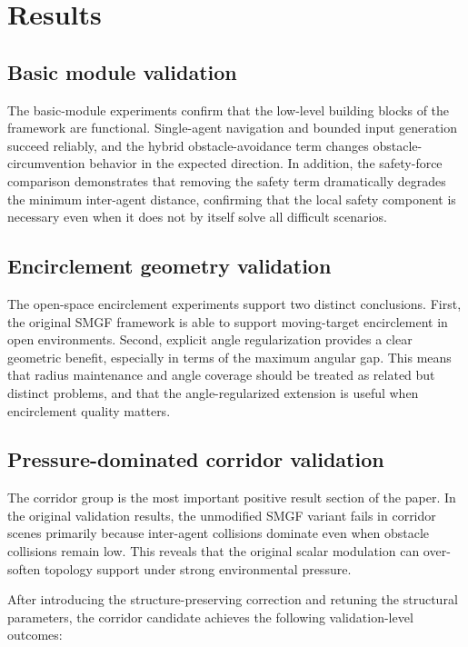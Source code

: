 \documentclass[utf8]{FrontiersinHarvard}
\begin{document}
\section{Results}

\subsection{Basic module validation}

The basic-module experiments confirm that the low-level building blocks of the framework are functional. Single-agent navigation and bounded input generation succeed reliably, and the hybrid obstacle-avoidance term changes obstacle-circumvention behavior in the expected direction. In addition, the safety-force comparison demonstrates that removing the safety term dramatically degrades the minimum inter-agent distance, confirming that the local safety component is necessary even when it does not by itself solve all difficult scenarios.

\subsection{Encirclement geometry validation}

The open-space encirclement experiments support two distinct conclusions. First, the original SMGF framework is able to support moving-target encirclement in open environments. Second, explicit angle regularization provides a clear geometric benefit, especially in terms of the maximum angular gap. This means that radius maintenance and angle coverage should be treated as related but distinct problems, and that the angle-regularized extension is useful when encirclement quality matters.

\subsection{Pressure-dominated corridor validation}

The corridor group is the most important positive result section of the paper. In the original validation results, the unmodified SMGF variant fails in corridor scenes primarily because inter-agent collisions dominate even when obstacle collisions remain low. This reveals that the original scalar modulation can over-soften topology support under strong environmental pressure.

After introducing the structure-preserving correction and retuning the structural parameters, the corridor candidate achieves the following validation-level outcomes:
\end{document}
